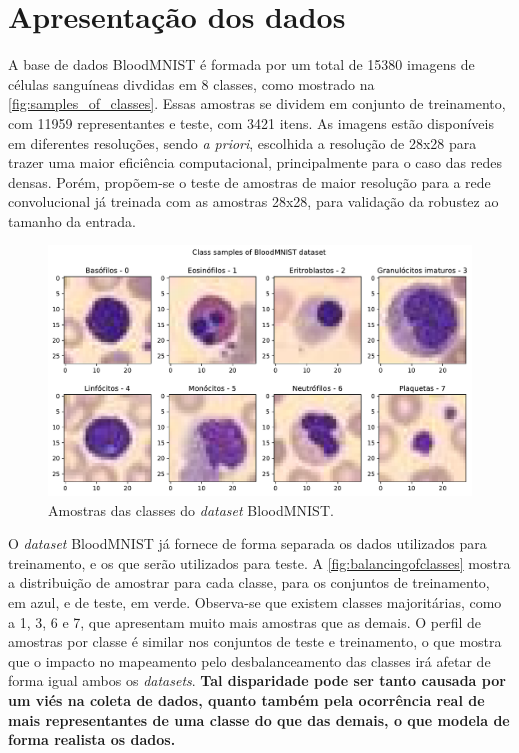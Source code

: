 \section{Apresentação dos dados}

A base de dados BloodMNIST é formada por um total de 15380 imagens de células sanguíneas divdidas em 8 classes, como mostrado na \autoref{fig:samples_of_classes}. Essas amostras se dividem em conjunto de treinamento, com 11959 representantes e teste, com 3421 itens. As imagens estão disponíveis em diferentes resoluções, sendo \textit{a priori}, escolhida a resolução de 28x28 para trazer uma maior eficiência computacional, principalmente para o caso das redes densas. Porém, propõem-se o teste de amostras de maior resolução para a rede convolucional já treinada com as amostras 28x28, para validação da robustez ao tamanho da entrada.

\begin{figure}[H]
	\centering
	\includegraphics[width=0.75\linewidth]{../../plot/samples_of_classes}
	\caption{Amostras das classes do \textit{dataset} BloodMNIST.}
	\label{fig:samples_of_classes}
\end{figure}

O \textit{dataset} BloodMNIST já fornece de forma separada os dados utilizados para treinamento, e os que serão utilizados para teste. A \autoref{fig:balancingofclasses} mostra a distribuição de amostrar para cada classe, para os conjuntos de treinamento, em azul, e de teste, em verde. Observa-se que existem classes majoritárias, como a 1, 3, 6 e 7, que apresentam muito mais amostras que as demais. O perfil de amostras por classe é similar nos conjuntos de teste e treinamento, o que mostra que o impacto no mapeamento pelo desbalanceamento das classes irá afetar de forma igual ambos os \textit{datasets}. \textbf{Tal disparidade pode ser tanto causada por um viés na coleta de dados, quanto também pela ocorrência real de mais representantes de uma classe do que das demais, o que modela de forma realista os dados.}

